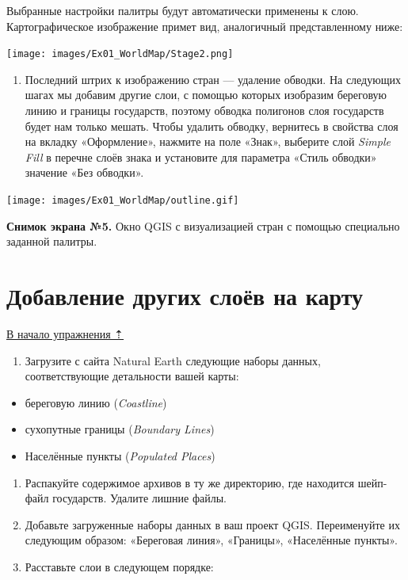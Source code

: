 \documentclass[
  12pt,
]{book}
\providecommand{\tightlist}{%
  \setlength{\itemsep}{0pt}\setlength{\parskip}{0pt}}
\begin{document}
Выбранные настройки палитры будут автоматически применены к слою. Картографическое изображение примет вид, аналогичный представленному ниже:

\texttt{[image: images/Ex01\_WorldMap/Stage2.png]}

\begin{enumerate}
\def\labelenumi{\arabic{enumi}.}
\setcounter{enumi}{15}
\tightlist
\item
  Последний штрих к изображению стран --- удаление обводки. На следующих шагах мы добавим другие слои, с помощью которых изобразим береговую линию и границы государств, поэтому обводка полигонов слоя государств будет нам только мешать. Чтобы удалить обводку, вернитесь в свойства слоя на вкладку «Оформление», нажмите на поле «Знак», выберите слой \emph{Simple Fill} в перечне слоёв знака и установите для параметра «Стиль обводки» значение «Без обводки».
\end{enumerate}

\texttt{[image: images/Ex01\_WorldMap/outline.gif]}

\textbf{Снимок экрана №5.} Окно QGIS с визуализацией стран с помощью специально заданной палитры.

\hypertarget{map-design-world-other-layers}{%
\section{Добавление других слоёв на карту}\label{map-design-world-other-layers}}

\protect\hyperlink{map-design-world}{В начало упражнения ⇡}

\begin{enumerate}
\def\labelenumi{\arabic{enumi}.}
\tightlist
\item
  Загрузите с сайта Natural Earth следующие наборы данных, соответствующие детальности вашей карты:
\end{enumerate}

\begin{itemize}
\tightlist
\item
  береговую линию (\emph{Coastline})
\item
  сухопутные границы (\emph{Boundary Lines})
\item
  Населённые пункты (\emph{Populated Places})
\end{itemize}

\begin{enumerate}
\def\labelenumi{\arabic{enumi}.}
\setcounter{enumi}{1}
\item
  Распакуйте содержимое архивов в ту же директорию, где находится шейп-файл государств. Удалите лишние файлы.
\item
  Добавьте загруженные наборы данных в ваш проект QGIS. Переименуйте их следующим образом: «Береговая линия», «Границы», «Населённые пункты».
\item
  Расставьте слои в следующем порядке:
\end{enumerate}
\end{document}
